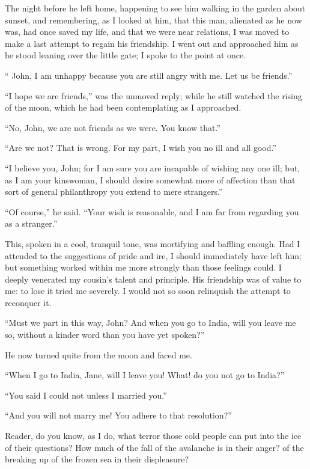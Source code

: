 The night before he left home, happening to see him walking in the
garden about sunset, and remembering, as I looked at him, that this man,
alienated as he now was, had once saved my life, and that we were near
relations, I was moved to make a last attempt to regain his friendship.
I went out and approached him as he stood leaning over the little gate;
I spoke to the point at once.

\enquote{\St{} John, I am unhappy because you are still angry with me.
	Let us be friends.}

\enquote{I hope we are friends,} was the unmoved reply; while he still
watched the rising of the moon, which he had been contemplating as I
approached.

\enquote{No, \St{} John, we are not friends as we were. You know that.}

\enquote{Are we not? That is wrong. For my part, I wish you no ill and
	all good.}

\enquote{I believe you, \St{} John; for I am sure you are incapable of
	wishing any one ill; but, as I am your kinswoman, I should desire
	somewhat more of affection than that sort of general philanthropy you
	extend to mere strangers.}

\enquote{Of course,} he said. \enquote{Your wish is reasonable, and I
	am far from regarding you as a stranger.}

This, spoken in a cool, tranquil tone, was mortifying and baffling
enough. Had I attended to the suggestions of pride and ire, I should
immediately have left him; but something worked within me more strongly
than those feelings could. I deeply venerated my cousin's talent and
principle. His friendship was of value to me: to lose it tried me
severely. I would not so soon relinquish the attempt to reconquer it.

\enquote{Must we part in this way, \St{} John? And when you go to India,
	will you leave me so, without a kinder word than you have yet spoken?}

He now turned quite from the moon and faced me.

\enquote{When I go to India, Jane, will I leave you! What! do you not
	go to India?}

\enquote{You said I could not unless I married you.}

\enquote{And you will not marry me! You adhere to that resolution?}

Reader, do you know, as I do, what terror those cold people can put into
the ice of their questions? How much of the fall of the avalanche is in
their anger? of the breaking up of the frozen sea in their displeasure?

